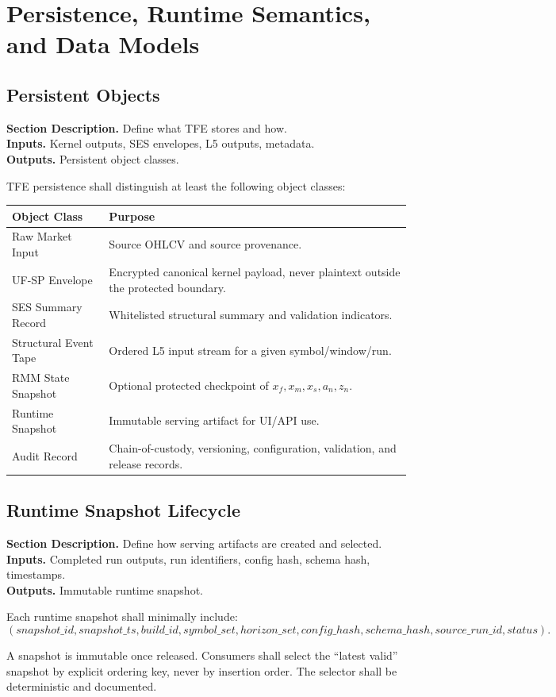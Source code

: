 \documentclass[11pt]{report}
\newcommand{\meta}[3]{\textbf{Section Description.} #1\\
\textbf{Inputs.} #2\\
\textbf{Outputs.} #3\par}
\begin{document}
\chapter{Persistence, Runtime Semantics, and Data Models}
\section{Persistent Objects}
\meta{Define what TFE stores and how.}{Kernel outputs, SES envelopes, L5 outputs, metadata.}{Persistent object classes.}

TFE persistence shall distinguish at least the following object classes:
\begin{longtable}{p{}p{}}
\toprule
Object Class & Purpose \\
\midrule
Raw Market Input & Source OHLCV and source provenance. \\
UF-SP Envelope & Encrypted canonical kernel payload, never plaintext outside the protected boundary. \\
SES Summary Record & Whitelisted structural summary and validation indicators. \\
Structural Event Tape & Ordered L5 input stream for a given symbol/window/run. \\
RMM State Snapshot & Optional protected checkpoint of $x_f,x_m,x_s,a_n,z_n$. \\
Runtime Snapshot & Immutable serving artifact for UI/API use. \\
Audit Record & Chain-of-custody, versioning, configuration, validation, and release records. \\
\bottomrule
\end{longtable}

\section{Runtime Snapshot Lifecycle}
\meta{Define how serving artifacts are created and selected.}{Completed run outputs, run identifiers, config hash, schema hash, timestamps.}{Immutable runtime snapshot.}

Each runtime snapshot shall minimally include:
\[
(snapshot\_id, snapshot\_ts, build\_id, symbol\_set, horizon\_set, config\_hash, schema\_hash, source\_run\_id, status).
\]

A snapshot is immutable once released. Consumers shall select the ``latest valid'' snapshot by explicit ordering key, never by insertion order. The selector shall be deterministic and documented.
\end{document}
